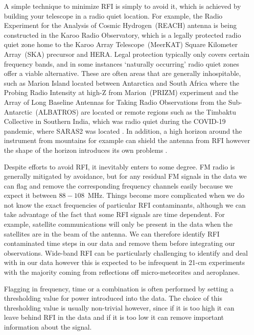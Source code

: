 A simple technique to minimize RFI is simply to avoid it, which is achieved by building your telescope in a radio quiet location. For example, the Radio Experiment for the Analysis of Cosmic Hydrogen~(REACH) antenna is being constructed in the Karoo Radio Observatory, which is a legally protected radio quiet zone home to the Karoo Array Telescope~(MeerKAT) Square Kilometer Array~(SKA) precursor and HERA. Legal protection typically only covers certain frequency bands, and in some instances `naturally occurring' radio quiet zones offer a viable alternative. These are often areas that are generally inhospitable, such as Marion Island located between Antarctica and South Africa where the Probing Radio Intensity at high-Z from Marion~(PRIZM) experiment \cite{Philip_PRIZM_2019} and the Array of Long Baseline Antennas for Taking Radio Observations from the Sub-Antarctic~(ALBATROS) \cite{albatros} are located or remote regions such as the Timbaktu Collective in Southern India, which was radio quiet during the COVID-19 pandemic, where SARAS2 was located \cite{Singh_saras2_2017, Singh_saras2_2018}. In addition, a high horizon around the instrument from mountains for example can shield the antenna from RFI however the shape of the horizon introduces its own problems \cite{Bassett_horizon_2021}.

Despite efforts to avoid RFI, it inevitably enters to some degree. FM radio is generally mitigated by avoidance, but for any residual FM signals in the data we can flag and remove the corresponding frequency channels easily because we expect it between $88 - 108$~MHz. Things become more complicated when we do not know the exact frequencies of particular RFI contaminants, although we can take advantage of the fact that some RFI signals are time dependent. For example, satellite communications will only be present in the data when the satellites are in the beam of the antenna. We can therefore identify RFI contaminated time steps in our data and remove them before integrating our observations. Wide-band RFI can be particularly challenging to identify and deal with in our data however this is expected to be infrequent in 21-cm experiments with the majority coming from reflections off micro-meteorites and aeroplanes.

Flagging in frequency, time or a combination is often performed by setting a thresholding value for power introduced into the data. The choice of this thresholding value is usually non-trivial however, since if it is too high it can leave behind RFI in the data and if it is too low it can remove important information about the signal.

